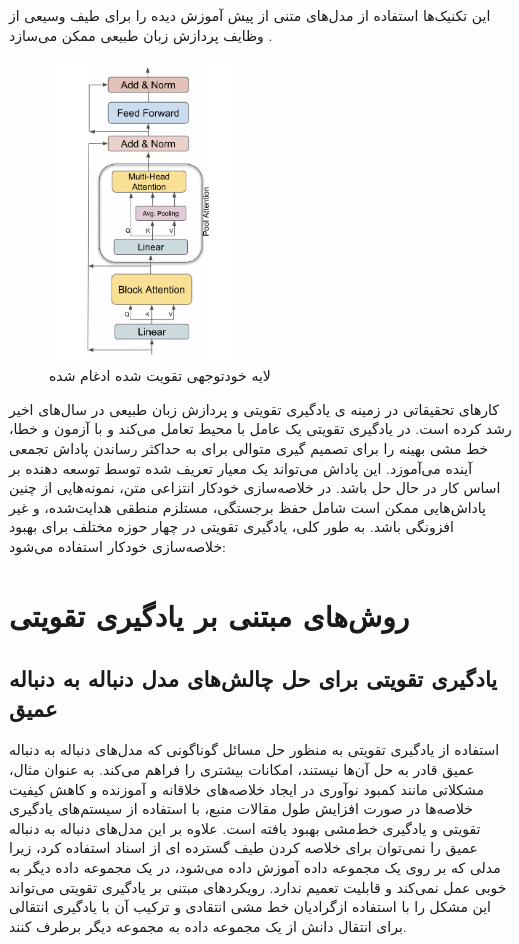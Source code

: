 این تکنیک‌ها استفاده از مدل‌های متنی از پیش آموزش دیده را برای طیف وسیعی از وظایف پردازش زبان طبیعی ممکن می‌سازد
 \cite{Xiong2022AdaptingPT}.
\begin{figure}[!h]
	\begin{center}
		\includegraphics[height=8cm]{pooling_attention.png}
	\end{center}
	\caption{ لایه خودتوجهی تقویت شده ادغام شده \cite{Xiong2022AdaptingPT}}
	\label{fig:attention_pooling}
	\medskip
	\small
\end{figure}
کارهای تحقیقاتی در زمینه ی یادگیری تقویتی
و پردازش زبان طبیعی در سال‌های اخیر رشد کرده است. در یادگیری تقویتی  یک عامل با محیط تعامل می‌کند و با آزمون و خطا، خط مشی بهینه را برای تصمیم گیری متوالی برای به حداکثر رساندن پاداش تجمعی آینده می‌آموزد. این پاداش می‌تواند یک معیار تعریف شده توسط توسعه دهنده بر اساس کار در حال حل باشد. در خلاصه‌سازی خودکار انتزاعی متن، نمونه‌هایی از چنین پاداش‌هایی ممکن است شامل حفظ برجستگی، مستلزم منطقی هدایت‌شده، و غیر افزونگی باشد. به طور کلی،  یادگیری تقویتی  در چهار حوزه مختلف برای بهبود خلاصه‌سازی خودکار استفاده می‌شود:

\section{روش‌های مبتنی بر یادگیری تقویتی}
\subsection{ یادگیری تقویتی برای حل چالش‌های مدل دنباله به دنباله عمیق}

استفاده از یادگیری تقویتی به منظور حل مسائل گوناگونی که مدل‌های دنباله به دنباله عمیق قادر به حل آن‌ها نیستند، امکانات بیشتری را فراهم می‌کند. به عنوان مثال، مشکلاتی مانند کمبود نوآوری در ایجاد خلاصه‌های خلاقانه و آموزنده و کاهش کیفیت خلاصه‌ها در صورت افزایش طول مقالات منبع، با استفاده از سیستم‌های یادگیری تقویتی و یادگیری خط‌مشی بهبود یافته است.
علاوه بر این  مدل‌های دنباله به دنباله عمیق را نمی‌توان برای خلاصه کردن طیف گسترده ای از اسناد استفاده کرد، زیرا مدلی که بر روی یک مجموعه داده آموزش داده می‌شود، در یک مجموعه داده دیگر به خوبی عمل نمی‌کند و قابلیت تعمیم ندارد. رویکردهای مبتنی بر یادگیری تقویتی می‌تواند این  مشکل را با استفاده ازگرادیان خط مشی انتقادی 
و ترکیب آن با یادگیری انتقالی
برای انتقال دانش از یک مجموعه داده به مجموعه دیگر برطرف کنند\cite{DeepTL_RL}.

